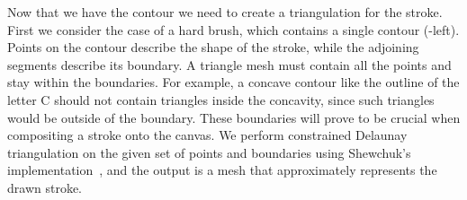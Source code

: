 \documentclass[conference]{acmsiggraph}
\begin{document}
Now that we have the contour we need to create a triangulation for the stroke. 
First we consider the case of a hard brush, which contains a single contour (-left).
Points on the contour describe the shape of the stroke, while the adjoining segments
describe its boundary.
A triangle mesh must contain all the points and stay
within the boundaries. 
For example, a concave contour like the outline of the letter C should not contain 
triangles inside the concavity, since such triangles would be outside of the boundary.
These boundaries will prove to be crucial when compositing a stroke onto the canvas.
%
We perform constrained Delaunay triangulation on the given set of points and boundaries using
Shewchuk's implementation~, and the output is a mesh that
approximately represents the drawn stroke.
\end{document}
